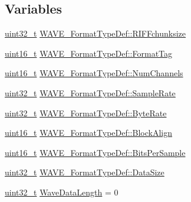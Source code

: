 \subsection*{Variables}
\begin{DoxyCompactItemize}
\item 
\hyperlink{stdint_8h_a435d1572bf3f880d55459d9805097f62}{uint32\-\_\-t} \hyperlink{group___w_a_v_e_p_l_a_y_e_r___private___variables_gaeaf1fe0b90f1ff0c7c4bc845e47fe7c5}{W\-A\-V\-E\-\_\-\-Format\-Type\-Def\-::\-R\-I\-F\-Fchunksize}
\item 
\hyperlink{stdint_8h_a273cf69d639a59973b6019625df33e30}{uint16\-\_\-t} \hyperlink{group___w_a_v_e_p_l_a_y_e_r___private___variables_gaa0d6b4c06edc073395827674b4345820}{W\-A\-V\-E\-\_\-\-Format\-Type\-Def\-::\-Format\-Tag}
\item 
\hyperlink{stdint_8h_a273cf69d639a59973b6019625df33e30}{uint16\-\_\-t} \hyperlink{group___w_a_v_e_p_l_a_y_e_r___private___variables_ga2bdeb90779a17e644107a5d855f4d344}{W\-A\-V\-E\-\_\-\-Format\-Type\-Def\-::\-Num\-Channels}
\item 
\hyperlink{stdint_8h_a435d1572bf3f880d55459d9805097f62}{uint32\-\_\-t} \hyperlink{group___w_a_v_e_p_l_a_y_e_r___private___variables_ga4f574183b180c6eee94ec82826583941}{W\-A\-V\-E\-\_\-\-Format\-Type\-Def\-::\-Sample\-Rate}
\item 
\hyperlink{stdint_8h_a435d1572bf3f880d55459d9805097f62}{uint32\-\_\-t} \hyperlink{group___w_a_v_e_p_l_a_y_e_r___private___variables_ga6f4f0874858518ee7ae3a7beb6bf9f34}{W\-A\-V\-E\-\_\-\-Format\-Type\-Def\-::\-Byte\-Rate}
\item 
\hyperlink{stdint_8h_a273cf69d639a59973b6019625df33e30}{uint16\-\_\-t} \hyperlink{group___w_a_v_e_p_l_a_y_e_r___private___variables_ga50c6bfe090b579d0b94ee9950bb7a03f}{W\-A\-V\-E\-\_\-\-Format\-Type\-Def\-::\-Block\-Align}
\item 
\hyperlink{stdint_8h_a273cf69d639a59973b6019625df33e30}{uint16\-\_\-t} \hyperlink{group___w_a_v_e_p_l_a_y_e_r___private___variables_gaed7cbe094ecca9b29332a1209f88a535}{W\-A\-V\-E\-\_\-\-Format\-Type\-Def\-::\-Bits\-Per\-Sample}
\item 
\hyperlink{stdint_8h_a435d1572bf3f880d55459d9805097f62}{uint32\-\_\-t} \hyperlink{group___w_a_v_e_p_l_a_y_e_r___private___variables_ga25442a9c895536fb4a7837811a8fe810}{W\-A\-V\-E\-\_\-\-Format\-Type\-Def\-::\-Data\-Size}
\item 
\hyperlink{stdint_8h_a435d1572bf3f880d55459d9805097f62}{uint32\-\_\-t} \hyperlink{group___w_a_v_e_p_l_a_y_e_r___private___variables_gaed5f7e51bea110d2f608278ffe6c48a3}{Wave\-Data\-Length} = 0

\end{DoxyCompactItemize}
